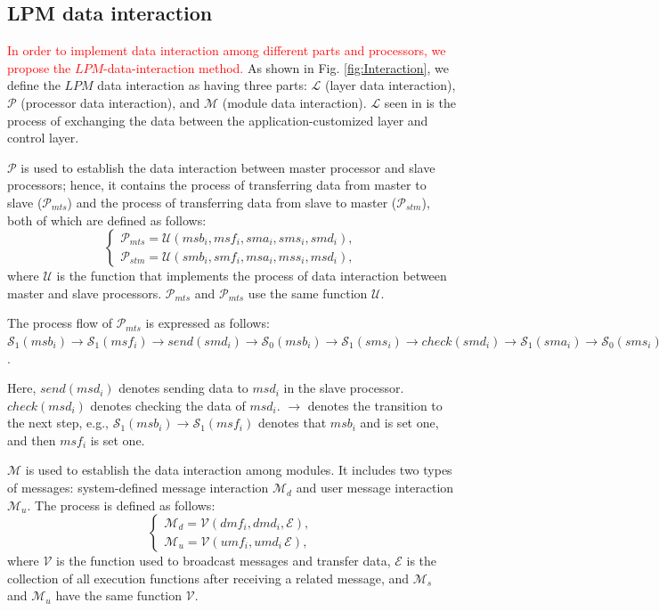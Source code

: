 \documentclass[journal,UTF8]{IEEEtran}
\begin{document}
	
	
	\subsection{LPM data interaction}
	\textcolor{red}{In order to implement data interaction among different parts and processors, we propose the $LPM$-data-interaction method.} As shown in Fig. \ref{fig:Interaction}, we define the $LPM$ data interaction as having three parts: $\mathcal{L}$ (layer data interaction), $\mathcal{P}$ (processor data interaction), and $\mathcal{M}$ (module data interaction). $\mathcal{L}$ seen in \cite{wu2018customized} is the process of exchanging the data between the application-customized layer and control layer.
	
	$\mathcal{P}$ is used to establish the data interaction between master processor and slave processors; hence, it contains the process of transferring data from master to slave ($\mathcal{P}_{mts}$) and the process of transferring data from slave to master ($\mathcal{P}_{stm}$), both of which are defined as follows:
	\begin{equation}
	\left\{
	\begin{array}{l}
	\mathcal{P}_{mts} = \mathcal{U} (msb_i,msf_i,sma_i,sms_i,smd_i),\\
	\mathcal{P}_{stm} = \mathcal{U} (smb_i,smf_i,msa_i,mss_i,msd_i),
	\end{array}
	\right.
	\end{equation}
	where $\mathcal{U}$ is the function that implements the process of data interaction between master and slave processors. $\mathcal{P}_{mts}$ and $\mathcal{P}_{mts}$ use the same function $\mathcal{U}$.
	
	The process flow of $\mathcal{P}_{mts}$ is expressed  as follows:
	$\mathcal{S}_1(msb_i)\to\mathcal{S}_1(msf_i)\to send(smd_i)\to\mathcal{S}_0(msb_i)\to\mathcal{S}_1(sms_i)\to check(smd_i)\to\mathcal{S}_1(sma_i)\to\mathcal{S}_0(sms_i)\to\mathcal{S}_0(sma_i)\to\mathcal{S}_0(msf_i)$.
	
	Here, $send(msd_i)$ denotes sending data to $msd_i$ in the slave processor. $check(msd_i)$ denotes checking the  data of $msd_i$. $\to$ denotes the transition to the next step, e.g., $\mathcal{S}_1(msb_i)\to\mathcal{S}_1(msf_i)$ denotes that $msb_i$ and is set one, and then $msf_i$ is set one.
	
	$\mathcal{M}$ is used to establish the data interaction among modules. It includes two types of messages: system-defined message interaction $\mathcal{M}_{d}$ and user message interaction $\mathcal{M}_{u}$. The process is defined as follows:
	\begin{equation}
	\left\{
	\begin{array}{l}
	\mathcal{M}_{d} = \mathcal{V} (dmf_i,dmd_i,\mathcal{E}),\\
	\mathcal{M}_{u} = \mathcal{V} (umf_i,umd_i\,\mathcal{E}),
	\end{array}
	\right.
	\end{equation}
	where $\mathcal{V}$ is the function used to broadcast messages and transfer data, $\mathcal{E}$ is the collection of all execution functions after receiving a related message, and $\mathcal{M}_{s}$ and $\mathcal{M}_{u}$ have the same function $\mathcal{V}$.
	
\end{document}
